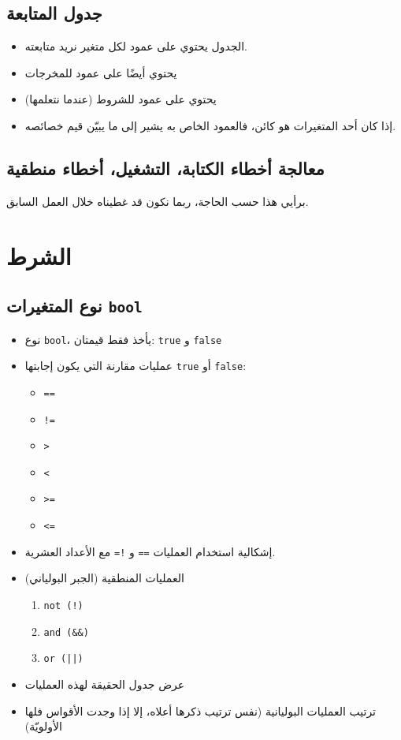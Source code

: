 ﻿\documentclass[14pt]{extarticle}
\begin{document}
\subsection{جدول المتابعة}

\begin{itemize}
    \item الجدول يحتوي على عمود لكل متغير نريد متابعته.
    \item يحتوي أيضًا على عمود للمخرجات
    \item يحتوي على عمود للشروط (عندما نتعلمها)
    \item إذا كان أحد المتغيرات هو كائن، فالعمود الخاص به يشير إلى ما يبيّن قيم خصائصه.
\end{itemize}

\subsection{معالجة أخطاء الكتابة، التشغيل، أخطاء منطقية}

برأيي هذا حسب الحاجة، ربما نكون قد غطيناه خلال العمل السابق.

\clearpage
\section{الشرط}

\subsection{نوع المتغيرات \texttt{bool}}
\begin{itemize}
    \item نوع \texttt{bool}، يأخذ فقط قيمتان: \texttt{true} و \texttt{false}
    \item عمليات مقارنة التي يكون إجابتها \texttt{true} أو \texttt{false}:
        \begin{itemize}
            \item \texttt{==}
            \item \texttt{!=}
            \item \texttt{>}
            \item \texttt{<}
            \item \texttt{>=}
            \item \texttt{<=}
        \end{itemize}
        \item إشكالية استخدام العمليات \texttt{==} و \texttt{!=} مع الأعداد العشرية.
        \item العمليات المنطقية (الجبر البولياني)
        \begin{enumerate}
            \item \texttt{not (!)}
            \item \texttt{and (\&\&)}
            \item \texttt{or (||)}
        \end{enumerate}
        \item عرض جدول الحقيقة لهذه العمليات
        \item ترتيب العمليات البوليانية (نفس ترتيب ذكرها أعلاه، إلا إذا وجدت الأقواس فلها الأولويّة)
\end{itemize}
\end{document}
